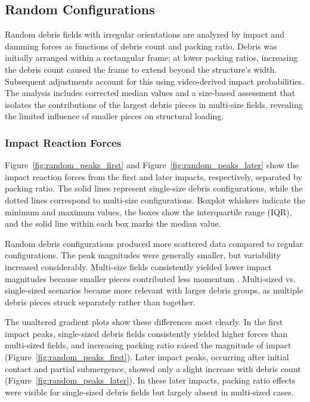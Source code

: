\documentclass{article}
\begin{document}
{\subsection{Random Configurations}
Random debris fields with irregular orientations are analyzed by impact and damming forces as functions of debris count and packing ratio. Debris was initially arranged within a rectangular frame; at lower packing ratios, increasing the debris count caused the frame to extend beyond the structure’s width. Subsequent adjustments account for this using video-derived impact probabilities. The analysis includes corrected median values and a size-based assessment that isolates the contributions of the largest debris pieces in multi-size fields, revealing the limited influence of smaller pieces on structural loading.

\subsubsection{Impact Reaction Forces} 
Figure~\ref{fig:random_peaks_first} and Figure~\ref{fig:random_peaks_later} show the impact reaction forces from the first and later impacts, respectively, separated by packing ratio. The solid lines represent single-size debris configurations, while the dotted lines correspond to multi-size configurations. Boxplot whiskers indicate the minimum and maximum values, the boxes show the interquartile range (IQR), and the solid line within each box marks the median value.

Random debris configurations produced more scattered data compared to regular configurations. The peak magnitudes were generally smaller, but variability increased considerably. Multi-size fields consistently yielded lower impact magnitudes because smaller pieces contributed less momentum . Multi-sized vs. single-sized scenarios became more relevant with larger debris groups, as multiple debris pieces struck separately rather than together.

The unaltered gradient plots show these differences most clearly. In the first impact peaks, single-sized debris fields consistently yielded higher forces than multi-sized fields, and increasing packing ratio raised the magnitude of impact (Figure~\ref{fig:random_peaks_first}). Later impact peaks, occurring after initial contact and partial submergence, showed only a slight increase with debris count (Figure~\ref{fig:random_peaks_later}). In these later impacts, packing ratio effects were visible for single-sized debris fields but largely absent in multi-sized cases.

}
\end{document}

